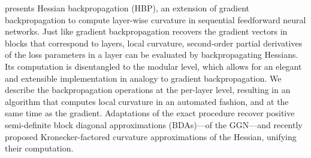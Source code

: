 presents Hessian backpropagation (HBP), an extension of gradient backpropagation
to compute layer-wise curvature in sequential feedforward neural networks. Just
like gradient backpropagation recovers the gradient vectors in blocks that
correspond to layers, local curvature, \ie second-order partial derivatives of
the loss \wrt parameters in a layer can be evaluated by backpropagating
Hessians. Its computation is disentangled to the modular level, which allows for
an elegant and extensible implementation in analogy to gradient backpropagation.
We describe the backpropagation operations at the per-layer level, resulting in
an algorithm that computes local curvature in an automated fashion, and at the
same time as the gradient. Adaptations of the exact procedure recover positive
semi-definite block diagonal approximations (BDAs)---\eg of the GGN---and
recently proposed Kronecker-factored curvature approximations
\cite{martens2015optimizing,botev2017practical,wei2018bdapch} of the Hessian,
unifying their computation.

